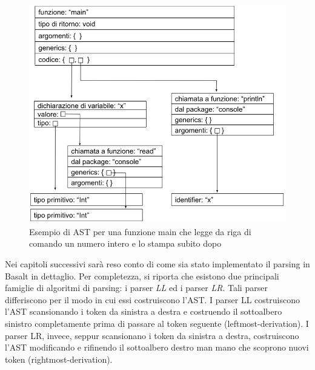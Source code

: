 \begin{figure}[H]
    \centering
        \includegraphics[width=1\textwidth]{../../Assets/BasaltAST.png}
    \caption{\centering Esempio di AST per una funzione main che legge da riga di comando un numero intero e lo stampa subito dopo} 
\end{figure}

Nei capitoli successivi sarà reso conto di come sia stato implementato il parsing in Basalt in dettaglio. Per completezza, si riporta che 
esistono due principali famiglie di algoritmi di parsing: i parser \textit{LL} ed i parser \textit{LR}. Tali parser differiscono per il modo in cui
essi costruiscono l'AST. I parser LL costruiscono l'AST scansionando i token da sinistra a destra e costruendo il sottoalbero sinistro completamente 
prima di passare al token seguente (leftmost-derivation). I parser LR, invece, seppur scansionano i token da sinistra a destra, costruiscono 
l'AST modificando e rifinendo il sottoalbero destro man mano che scoprono nuovi token (rightmost-derivation). \\
